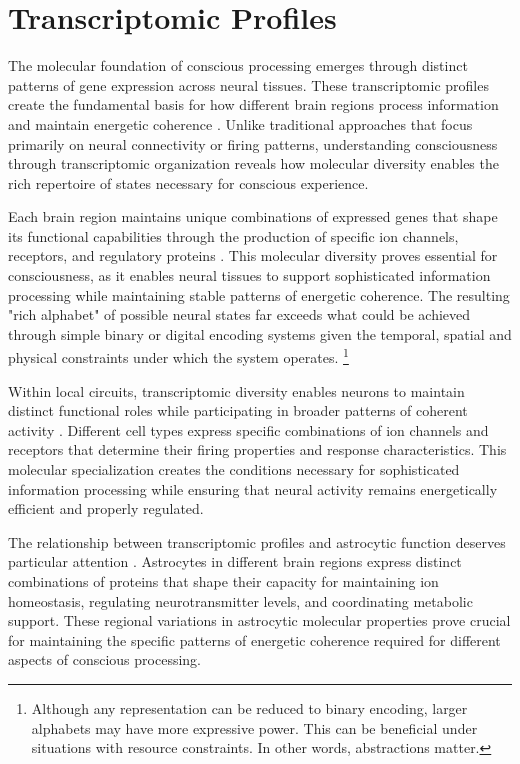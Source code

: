 \section{Transcriptomic Profiles}

The molecular foundation of conscious processing emerges through distinct patterns of gene expression across neural tissues. These transcriptomic profiles create the fundamental basis for how different brain regions process information and maintain energetic coherence \cite{Tasic2018}. Unlike traditional approaches that focus primarily on neural connectivity or firing patterns, understanding consciousness through transcriptomic organization reveals how molecular diversity enables the rich repertoire of states necessary for conscious experience.

Each brain region maintains unique combinations of expressed genes that shape its functional capabilities through the production of specific ion channels, receptors, and regulatory proteins \cite{Bakken2021}. This molecular diversity proves essential for consciousness, as it enables neural tissues to support sophisticated information processing while maintaining stable patterns of energetic coherence. The resulting "rich alphabet" of possible neural states far exceeds what could be achieved through simple binary or digital encoding systems given the temporal, spatial and physical constraints under which the system operates. \footnote{Although any representation can be reduced to binary encoding, larger alphabets may have more expressive power. This can be beneficial under situations with resource constraints. In other words, abstractions matter.}

Within local circuits, transcriptomic diversity enables neurons to maintain distinct functional roles while participating in broader patterns of coherent activity \cite{Lake2016}. Different cell types express specific combinations of ion channels and receptors that determine their firing properties and response characteristics. This molecular specialization creates the conditions necessary for sophisticated information processing while ensuring that neural activity remains energetically efficient and properly regulated.

The relationship between transcriptomic profiles and astrocytic function deserves particular attention \cite{Zhang2010}. Astrocytes in different brain regions express distinct combinations of proteins that shape their capacity for maintaining ion homeostasis, regulating neurotransmitter levels, and coordinating metabolic support. These regional variations in astrocytic molecular properties prove crucial for maintaining the specific patterns of energetic coherence required for different aspects of conscious processing.

